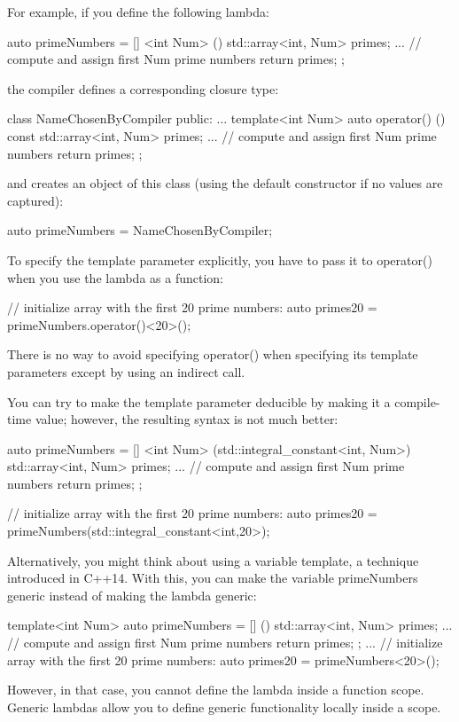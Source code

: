 For example, if you define the following lambda:

\begin{cpp}
auto primeNumbers = [] <int Num> () {
						std::array<int, Num> primes{};
						... // compute and assign first Num prime numbers
						return primes;
					};
\end{cpp}

the compiler defines a corresponding closure type:

\begin{cpp}
class NameChosenByCompiler {
public:
	...
	template<int Num>
	auto operator() () const {
		std::array<int, Num> primes{};
		... // compute and assign first Num prime numbers
		return primes;
	}
};
\end{cpp}

and creates an object of this class (using the default constructor if no values are captured):

\begin{cpp}
auto primeNumbers = NameChosenByCompiler{};
\end{cpp}

To specify the template parameter explicitly, you have to pass it to operator() when you use the lambda as a function:

\begin{cpp}
// initialize array with the first 20 prime numbers:
auto primes20 = primeNumbers.operator()<20>();
\end{cpp}

There is no way to avoid specifying operator() when specifying its template parameters except by using an indirect call.

You can try to make the template parameter deducible by making it a compile-time value; however, the resulting syntax is not much better:

\begin{cpp}
auto primeNumbers = [] <int Num> (std::integral_constant<int, Num>) {
						std::array<int, Num> primes{};
						... // compute and assign first Num prime numbers
						return primes;
					};

// initialize array with the first 20 prime numbers:
auto primes20 = primeNumbers(std::integral_constant<int,20>{});
\end{cpp}

Alternatively, you might think about using a variable template, a technique introduced in C++14. With this, you can make the variable primeNumbers generic instead of making the lambda generic:

\begin{cpp}
template<int Num>
auto primeNumbers = [] () {
						std::array<int, Num> primes{};
						... // compute and assign first Num prime numbers
						return primes;
					};
...
// initialize array with the first 20 prime numbers:
auto primes20 = primeNumbers<20>();
\end{cpp}

However, in that case, you cannot define the lambda inside a function scope. Generic lambdas allow you to define generic functionality locally inside a scope.








